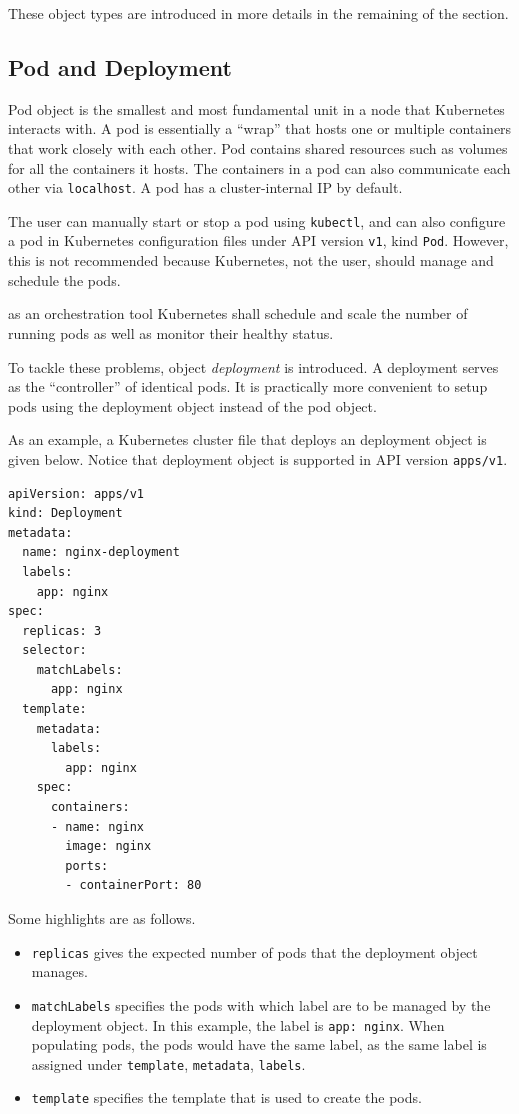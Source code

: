 These object types are introduced in more details in the remaining of the section.

\subsection{Pod and Deployment}

Pod object is the smallest and most fundamental unit in a node that Kubernetes interacts with. A pod is essentially a ``wrap'' that hosts one or multiple containers that work closely with each other. Pod contains shared resources such as volumes for all the containers it hosts. The containers in a pod can also communicate each other via \verb|localhost|. A pod has a cluster-internal IP by default.

The user can manually start or stop a pod using \verb|kubectl|, and can also configure a pod in Kubernetes configuration files under API version \verb|v1|, kind \verb|Pod|. However, this is not recommended because Kubernetes, not the user, should manage and schedule the pods.

as an orchestration tool Kubernetes shall schedule and scale the number of running pods as well as monitor their healthy status.

To tackle these problems, object \textit{deployment} is introduced. A deployment serves as the ``controller'' of identical pods. It is practically more convenient to setup pods using the deployment object instead of the pod object. 

As an example, a Kubernetes cluster file that deploys an deployment object is given below. Notice that deployment object is supported in API version \verb|apps/v1|.
\begin{lstlisting}
apiVersion: apps/v1
kind: Deployment
metadata:
  name: nginx-deployment
  labels:
    app: nginx
spec:
  replicas: 3
  selector:
    matchLabels:
      app: nginx
  template:
    metadata:
      labels:
        app: nginx
    spec:
      containers:
      - name: nginx
        image: nginx
        ports:
        - containerPort: 80

\end{lstlisting}
Some highlights are as follows.
\begin{itemize}
	\item \verb|replicas| gives the expected number of pods that the deployment object manages.
	\item \verb|matchLabels| specifies the pods with which label are to be managed by the deployment object. In this example, the label is \verb|app: nginx|. When populating pods, the pods would have the same label, as the same label is assigned under \verb|template|, \verb|metadata|, \verb|labels|.
	\item \verb|template| specifies the template that is used to create the pods.
\end{itemize}

